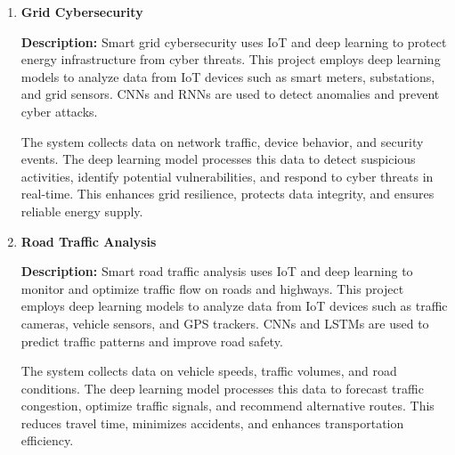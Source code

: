 \documentclass{article}
\begin{document}
\begin{enumerate}[label=\textbf{\arabic*.}, leftmargin=*]

\vspace{24pt} %
\item \textbf{Grid Cybersecurity}

\textbf{Description:}
Smart grid cybersecurity uses IoT and deep learning to protect energy infrastructure from cyber threats. This project employs deep learning models to analyze data from IoT devices such as smart meters, substations, and grid sensors. CNNs and RNNs are used to detect anomalies and prevent cyber attacks.

The system collects data on network traffic, device behavior, and security events. The deep learning model processes this data to detect suspicious activities, identify potential vulnerabilities, and respond to cyber threats in real-time. This enhances grid resilience, protects data integrity, and ensures reliable energy supply.



\vspace{24pt} %
\item \textbf{Road Traffic Analysis}

\textbf{Description:}
Smart road traffic analysis uses IoT and deep learning to monitor and optimize traffic flow on roads and highways. This project employs deep learning models to analyze data from IoT devices such as traffic cameras, vehicle sensors, and GPS trackers. CNNs and LSTMs are used to predict traffic patterns and improve road safety.

The system collects data on vehicle speeds, traffic volumes, and road conditions. The deep learning model processes this data to forecast traffic congestion, optimize traffic signals, and recommend alternative routes. This reduces travel time, minimizes accidents, and enhances transportation efficiency.




\end{enumerate}
\end{document}
